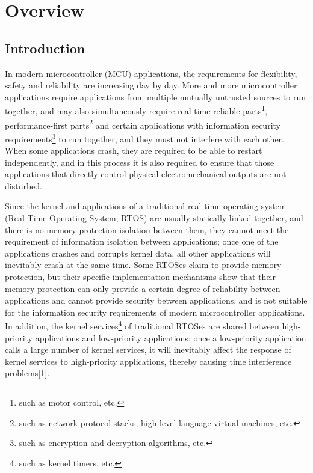 \chapter{Overview}\label{ch:1-overview}

\section{Introduction}\label{sec:1-1}

In modern microcontroller (MCU) applications, the requirements for flexibility, safety and reliability are increasing day by day. More and more microcontroller applications require applications from multiple mutually untrusted sources to run together, and may also simultaneously require real-time reliable parts\footnote{such as motor control, etc.}, performance-first parts\footnote{such as network protocol stacks, high-level language virtual machines, etc.} and certain applications with information security requirements\footnote{such as encryption and decryption algorithms, etc.} to run together, and they must not interfere with each other. When some applications crash, they are required to be able to restart independently, and in this process it is also required to ensure that those applications that directly control physical electromechanical outputs are not disturbed.

Since the kernel and applications of a traditional real-time operating system (Real-Time Operating
System, RTOS) are usually statically linked together, and there is no memory protection isolation between them, they cannot meet the requirement of information isolation between applications; once one of the applications crashes and corrupts kernel data, all other applications will inevitably crash at the same time. Some RTOSes claim to provide memory protection, but their specific implementation mechanisms show that their memory protection can only provide a certain degree of reliability between applications and cannot provide security between applications, and is not suitable for the information security requirements of modern microcontroller applications. In addition, the kernel services\footnote{such as kernel timers, etc.} of traditional RTOSes are shared between high-priority applications and low-priority applications; once a low-priority application calls a large number of kernel services, it will inevitably affect the response of kernel services to high-priority applications, thereby causing time interference problems\protect\hyperref[cite:1-1]{{[}1{]}}.


